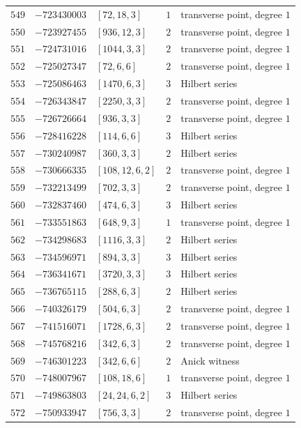 \documentclass[11pt]{article}
\begin{document}
\begin{center}
\begin{longtable}{r r l c l}
$549$ & $-723430003$ & $[72,18,3]$ & $1$ & transverse point, degree $1$\\
$550$ & $-723927455$ & $[936,12,3]$ & $2$ & transverse point, degree $1$\\
$551$ & $-724731016$ & $[1044,3,3]$ & $2$ & transverse point, degree $1$\\
$552$ & $-725027347$ & $[72,6,6]$ & $2$ & transverse point, degree $1$\\
$553$ & $-725086463$ & $[1470,6,3]$ & $3$ & Hilbert series\\
$554$ & $-726343847$ & $[2250,3,3]$ & $2$ & transverse point, degree $1$\\
$555$ & $-726726664$ & $[936,3,3]$ & $2$ & transverse point, degree $1$\\
$556$ & $-728416228$ & $[114,6,6]$ & $3$ & Hilbert series\\
$557$ & $-730240987$ & $[360,3,3]$ & $2$ & Hilbert series\\
$558$ & $-730666335$ & $[108,12,6,2]$ & $2$ & transverse point, degree $1$\\
$559$ & $-732213499$ & $[702,3,3]$ & $2$ & transverse point, degree $1$\\
$560$ & $-732837460$ & $[474,6,3]$ & $3$ & Hilbert series\\
$561$ & $-733551863$ & $[648,9,3]$ & $1$ & transverse point, degree $1$\\
$562$ & $-734298683$ & $[1116,3,3]$ & $2$ & Hilbert series\\
$563$ & $-734596971$ & $[894,3,3]$ & $3$ & Hilbert series\\
$564$ & $-736341671$ & $[3720,3,3]$ & $3$ & Hilbert series\\
$565$ & $-736765115$ & $[288,6,3]$ & $2$ & Hilbert series\\
$566$ & $-740326179$ & $[504,6,3]$ & $2$ & transverse point, degree $1$\\
$567$ & $-741516071$ & $[1728,6,3]$ & $2$ & transverse point, degree $1$\\
$568$ & $-745768216$ & $[342,6,3]$ & $2$ & transverse point, degree $1$\\
$569$ & $-746301223$ & $[342,6,6]$ & $2$ & Anick witness\\
$570$ & $-748007967$ & $[108,18,6]$ & $1$ & transverse point, degree $1$\\
$571$ & $-749863803$ & $[24,24,6,2]$ & $3$ & Hilbert series\\
$572$ & $-750933947$ & $[756,3,3]$ & $2$ & transverse point, degree $1$\\

\end{longtable}
\end{center}
\end{document}

